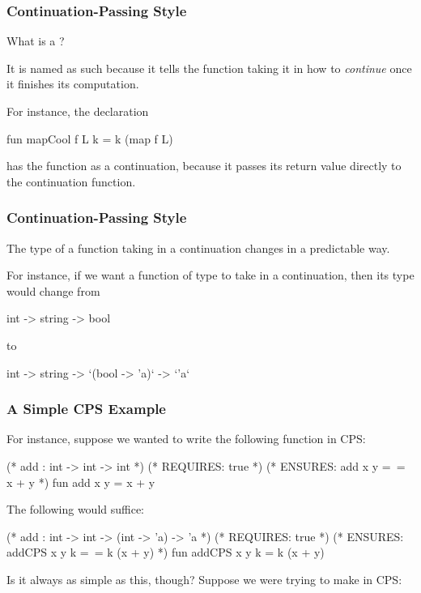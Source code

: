 \documentclass[aspectratio=169]{beamer}
\begin{document}
\begin{frame}[fragile]
  \frametitle{Continuation-Passing Style}

  What is a ?


  It is named as such because it tells the function taking it in how to
  \textit{continue} once it finishes its computation.

  For instance, the declaration
  \begin{codeblock}
    fun mapCool f L k = k (map f L)
  \end{codeblock}
  has the function  as a continuation, because it passes its
  return value directly to the continuation function.
\end{frame}

\begin{frame}[fragile]
  \frametitle{Continuation-Passing Style}

  The type of a function taking in a continuation changes in a predictable way.

  For instance, if we want a function of type  to
  take in a continuation, then its type would change from
  \begin{codeblock}
    int -> string -> bool
  \end{codeblock}
  to
  \begin{codeblock}
    int -> string -> `(bool -> 'a)` -> `'a`
  \end{codeblock}

\end{frame}

\begin{frame}[fragile]
  \frametitle{A Simple CPS Example}

  For instance, suppose we wanted to write the following function in CPS:
  \begin{codeblock}
    (* add : int -> int -> int *)
    (* REQUIRES: true *)
    (* ENSURES: add x y =~= x + y *)
    fun add x y = x + y
  \end{codeblock}

  The following would suffice:
  \begin{codeblock}
    (* add : int -> int -> (int -> 'a) -> 'a *)
    (* REQUIRES: true *)
    (* ENSURES: addCPS x y k =~= k (x + y) *)
    fun addCPS x y k = k (x + y)
  \end{codeblock}

  Is it always as simple as this, though? Suppose we were trying to
  make  in CPS:
\end{frame}
\end{document}
